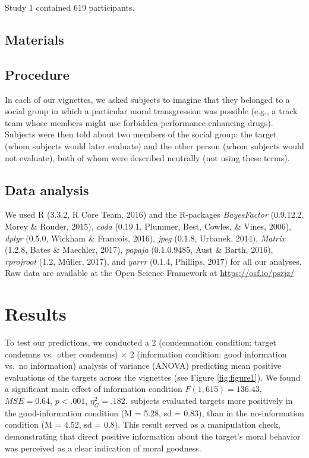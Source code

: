 \documentclass[english,pub]{apa6}
\theoremstyle{definition}
\theoremstyle{definition}
\theoremstyle{remark}
\begin{document}
Study 1 contained 619 participants.

\subsection{Materials}\label{materials}

\subsection{Procedure}\label{procedure}

In each of our vignettes, we asked subjects to imagine that they
belonged to a social group in which a particular moral transgression was
possible (e.g., a track team whose members might use forbidden
performance-enhancing drugs). Subjects were then told about two members
of the social group: the target (whom subjects would later evaluate) and
the other person (whom subjects would not evaluate), both of whom were
described neutrally (not using these terms).

\subsection{Data analysis}\label{data-analysis}

We used R (3.3.2, R Core Team, 2016) and the R-packages
\emph{BayesFactor} (0.9.12.2, Morey \& Rouder, 2015), \emph{coda}
(0.19.1, Plummer, Best, Cowles, \& Vines, 2006), \emph{dplyr} (0.5.0,
Wickham \& Francois, 2016), \emph{jpeg} (0.1.8, Urbanek, 2014),
\emph{Matrix} (1.2.8, Bates \& Maechler, 2017), \emph{papaja}
(0.1.0.9485, Aust \& Barth, 2016), \emph{rprojroot} (1.2, Müller, 2017),
and \emph{yarrr} (0.1.4, Phillips, 2017) for all our analyses. Raw data
are available at the Open Science Framework at
\url{https://osf.io/pszjz/}

\section{Results}\label{results}

To test our predictions, we conducted a 2 (condemnation condition:
target condemns vs.~other condemns) × 2 (information condition: good
information vs.~no information) analysis of variance (ANOVA) predicting
mean positive evaluations of the targets across the vignettes (see
Figure \ref{fig:figure1}). We found a significant main effect of
information condition \(F(1, 615) = 136.43\), \(\mathit{MSE} = 0.64\),
\(p < .001\), \(\eta^2_G = .182\). subjects evaluated targets more
positively in the good-information condition (M = 5.28, sd = 0.83), than
in the no-information condition (M = 4.52, sd = 0.8). This result served
as a manipulation check, demonstrating that direct positive information
about the target's moral behavior was perceived as a clear indication of
moral goodness.
\end{document}
